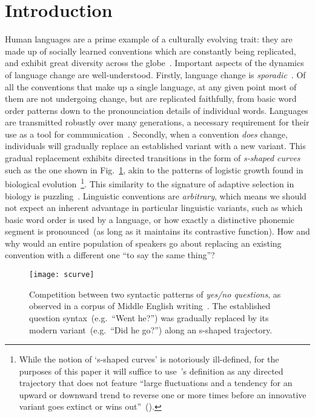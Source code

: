 \section{Introduction}

Human languages are a prime example of a culturally evolving trait: they are made up of socially learned conventions which are constantly being replicated, and exhibit great diversity across the globe~\citep{Evans2009}. Important aspects of the dynamics of language change are well-understood. Firstly, language change is \emph{sporadic}~\citep{Saussure1959,Labov2001}. Of all the conventions that make up a single language, at any given point most of them are not undergoing change, but are replicated faithfully, from basic word order patterns down to the pronounciation details of individual words. %
Languages are transmitted robustly over many generations, a necessary requirement for their use as a tool for communication~\citep{Lewis2012}. Secondly, when a convention \emph{does} change, individuals will gradually replace an established variant with a new variant. This gradual replacement exhibits directed transitions in the form of \emph{s-shaped curves} such as the one shown in Fig.~\ref{fig:scurve}, akin to the patterns of logistic growth found in biological evolution~\citep{Bailey1973,Altmann1983,Kroch1989cr,Denison2003,Blythe2012}\footnote{While the notion of `s-shaped curves' is notoriously ill-defined, for the purposes of this paper it will suffice to use~\citeauthor{Blythe2012}'s definition as any directed trajectory that does not feature ``large fluctuations and a tendency for an upward or downward trend to reverse one or more times before an innovative variant goes extinct or wins out''~(\citeyear[p.285]{Blythe2012}).}. This similarity to the signature of adaptive selection in biology is puzzling~\citep[ch.1]{Labov2001}. Linguistic conventions are \emph{arbitrary}, which means we should not expect an inherent advantage in particular linguistic variants, such as which basic word order is used by a language, or how exactly a distinctive phonemic segment is pronounced~(as long as it maintains its contrastive function). How and why would an entire population of speakers go about replacing an existing convention with a different one ``to say the same thing''?

\begin{figure}[htb]
\centering
\texttt{[image: scurve]}
\caption[Competition between two syntactic patterns of \emph{yes/no questions}, as observed in a corpus of Middle English writing]{Competition between two syntactic patterns of \emph{yes/no questions}, as observed in a corpus of Middle English writing~\citep{Ellegard1953}. The established question syntax~(e.g.~``Went he?'') was gradually replaced by its modern variant~(e.g.~``Did he go?'') along an s-shaped trajectory.} 
\label{fig:scurve}
\end{figure}

